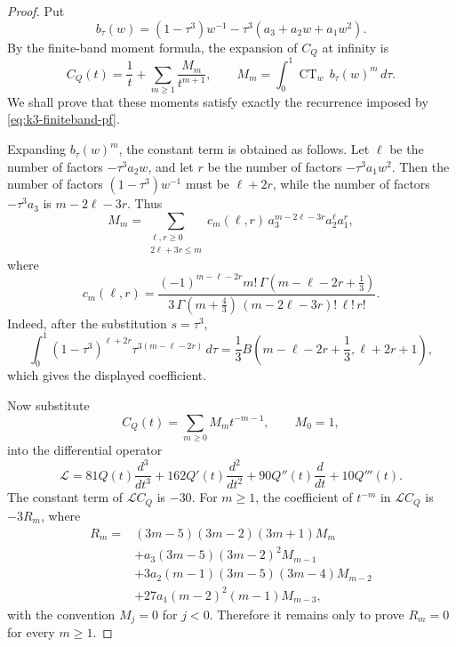 \documentclass[10pt,a4paper]{amsart}
\newcommand {\CT} {\operatorname {CT}}
\begin{document}
\begin{proof}
Put
\[
        b_\tau(w)=(1-\tau^3)w^{-1}
        -\tau^3(a_3+a_2w+a_1w^2).
\]
By the finite-band moment formula, the expansion of \(C_Q\) at infinity is
\[
        C_Q(t)=\frac1t+\sum_{m\ge1}\frac{M_m}{t^{m+1}},
        \qquad
        M_m=\int_0^1 \CT_w\, b_\tau(w)^m\,d\tau .
\]
We shall prove that these moments satisfy exactly the recurrence imposed by
\eqref{eq:k3-finiteband-pf}.

Expanding \(b_\tau(w)^m\), the constant term is obtained as follows.  Let
\(\ell\) be the number of factors \(-\tau^3a_2w\), and let \(r\) be the number
of factors \(-\tau^3a_1w^2\).  Then the number of factors
\((1-\tau^3)w^{-1}\) must be \(\ell+2r\), while the number of factors
\(-\tau^3a_3\) is \(m-2\ell-3r\).  Thus
\[
        M_m=\sum_{\substack{\ell,r\ge0\\2\ell+3r\le m}}
        c_m(\ell,r)\,
        a_3^{m-2\ell-3r}a_2^\ell a_1^r ,
\]
where
\[
        c_m(\ell,r)=
        \frac{(-1)^{m-\ell-2r}m!\,
        \Gamma(m-\ell-2r+\frac13)}
        {3\,\Gamma(m+\frac43)\,
        (m-2\ell-3r)!\,\ell!\,r!}.
\]
Indeed, after the substitution \(s=\tau^3\),
\[
        \int_0^1
        (1-\tau^3)^{\ell+2r}
        \tau^{3(m-\ell-2r)}\,d\tau
        =
        \frac13
        B\!\left(m-\ell-2r+\frac13,\ell+2r+1\right),
\]
which gives the displayed coefficient.

Now substitute
\[
        C_Q(t)=\sum_{m\ge0}M_m t^{-m-1},\qquad M_0=1,
\]
into the differential operator
\[
        \mathcal L
        =
        81Q(t)\frac{d^3}{dt^3}
        +162Q'(t)\frac{d^2}{dt^2}
        +90Q''(t)\frac{d}{dt}
        +10Q'''(t).
\]
The constant term of \(\mathcal L C_Q\) is \(-30\).  For \(m\ge1\), the
coefficient of \(t^{-m}\) in \(\mathcal L C_Q\) is \(-3R_m\), where
\[
\begin{split}
        R_m={}&
        (3m-5)(3m-2)(3m+1)M_m \\
        &+a_3(3m-5)(3m-2)^2M_{m-1} \\
        &+3a_2(m-1)(3m-5)(3m-4)M_{m-2} \\
        &+27a_1(m-2)^2(m-1)M_{m-3},
\end{split}
\]
with the convention \(M_j=0\) for \(j<0\).  Therefore it remains only to prove
\(R_m=0\) for every \(m\ge1\).


\end{proof}
\end{document}
